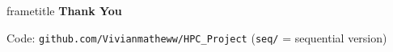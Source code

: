 \documentclass[aspectratio=169,10pt]{beamer}
\begin{document}
\appendix
\begin{frame}
\begin{center}
\vspace{1.6cm}
\begin{beamercolorbox}[wd=\paperwidth,sep=16pt,center]{frametitle}
{\Huge \textbf{Thank You}}
\end{beamercolorbox}
\vspace{0.8cm}

\small Code: \texttt{github.com/Vivianmatheww/HPC\_Project} \quad (\texttt{seq/} = sequential version)
\end{center}
\end{frame}
\end{document}
